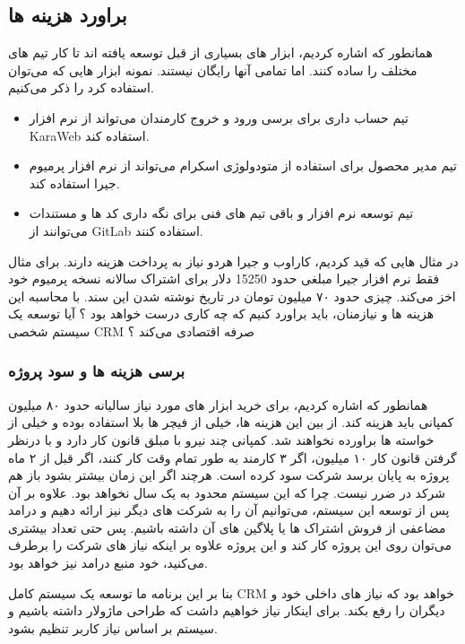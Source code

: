 \subsection{براورد هزینه ها}
همانطور که اشاره کردیم، ابزار های بسیاری از قبل توسعه یافته اند تا کار تیم های مختلف را ساده کنند. اما تمامی آنها رایگان نیستند.
نمونه ابزار هایی که می‌توان استفاده کرد را ذکر می‌کنیم.

\begin{itemize}
	\item تیم حساب داری برای برسی ورود و خروج کارمندان می‌تواند از نرم افزار KaraWeb استفاده کند.
	\item تیم مدیر محصول برای استفاده از متودولوژی اسکرام می‌تواند از نرم افزار پرمیوم جیرا استفاده کند.
	\item تیم توسعه نرم افزار و باقی تیم های فنی برای نگه داری کد ها و مستندات می‌توانند از GitLab استفاده کنند.
\end{itemize}

در مثال هایی که قید کردیم، کاراوب و جیرا هردو نیاز به پرداخت هزینه دارند.
برای مثال فقط نرم افزار جیرا مبلغی حدود 15250 دلار برای اشتراک سالانه نسخه پرمیوم خود اخز می‌کند. چیزی حدود ۷۰ میلیون تومان در تاریخ نوشته شدن این سند.
با محاسبه این هزینه ها و نیازمنان، باید براورد کنیم که چه کاری درست خواهد بود ؟
آیا توسعه یک سیستم شخصی CRM صرفه اقتصادی می‌کند ؟

\subsubsection{برسی هزینه ها و سود پروژه}
همانطور که اشاره کردیم، برای خرید ابزار های مورد نیاز سالیانه حدود ۸۰ میلیون کمپانی باید هزینه کند. از بین این هزینه ها، خیلی از فیچر ها بلا استفاده بوده
و خیلی از خواسته ها براورده نخواهند شد.
کمپانی چند نیرو با مبلق قانون کار دارد و با درنظر گرفتن قانون کار ۱۰ میلیون، اگر ۳ کارمند به طور تمام وقت کار کنند، اگر قبل از ۲ ماه پروژه به پایان برسد شرکت سود کرده است.
هرچند اگر این زمان بیشتر بشود باز هم شرکد در ضرر نیست. چرا که این سیستم محدود به یک سال نخواهد بود.
علاوه بر آن پس از توسعه این سیستم، می‌توانیم آن را به شرکت های دیگر نیز ارائه دهیم و درامد مضاعفی از فروش اشتراک ها یا پلاگین های آن داشته باشیم.
پس حتی تعداد بیشتری می‌توان روی این پروژه کار کند و این پروژه علاوه بر اینکه نیاز های شرکت را برطرف می‌کنید، خود منبع درامد نیز خواهد بود.

بنا بر این برنامه ما توسعه یک سیستم کامل CRM خواهد بود که نیاز های داخلی خود و دیگران را رفع بکند.
برای اینکار نیاز خواهیم داشت که طراحی ماژولار داشته باشیم و سیستم بر اساس نیاز کاربر تنظیم بشود.
